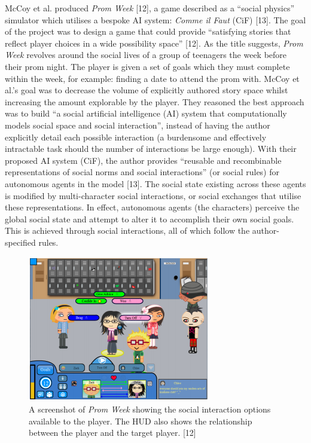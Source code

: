 \documentclass{sig-alternate-05-2015}
\begin{document}
McCoy et al. produced \textit{Prom Week} [12], a game described as a ``social physics'' simulator which utilises a bespoke AI system: \textit{Comme il Faut} (CiF) [13]. The goal of the project was to design a game that could provide ``satisfying stories that reflect player choices in a wide possibility space'' [12].
As the title suggests, \textit{Prom Week} revolves around the social lives of a group of teenagers the week before their prom night. The player is given a set of goals which they must complete within the week, for example: finding a date to attend the prom with. McCoy et al.'s goal was to decrease the volume of explicitly authored story space whilst increasing the amount explorable by the player. They reasoned the best approach was to build ``a social artificial intelligence (AI) system that computationally models social space and social interaction'', instead of having the author explicitly detail each possible interaction (a burdensome and effectively intractable task should the number of interactions be large enough). With their proposed AI system (CiF), the author provides ``reusable and recombinable representations of social norms and social interactions'' (or social rules) for autonomous agents in the model [13]. The social state existing across these agents is modified by multi-character social interactions, or social exchanges that utilise these representations. In effect, autonomous agents (the characters) perceive the global social state and attempt to alter it to accomplish their own social goals. This is achieved through social interactions, all of which follow the author-specified rules.\\

\begin{figure}
\centering
\includegraphics[scale=0.7]{Images/PromWeek.png}
\caption{A screenshot of \textit{Prom Week} showing the social interaction options available to the player. The HUD also shows the relationship between the player and the target player. [12]}
\end{figure}
\end{document}
